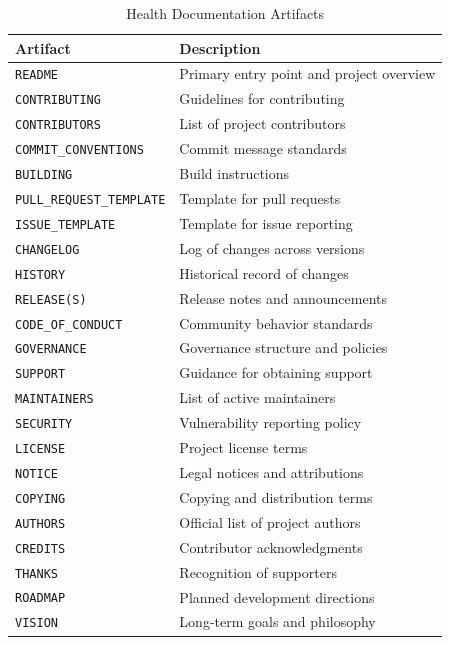 \documentclass[10pt,conference]{IEEEtran}
\begin{document}
\begin{table}[h]
\centering
\caption{Health Documentation Artifacts}
\label{tab:documentation_artifacts}
\renewcommand{\arraystretch}{1.3}
\begin{tabular}{p{3.5cm}p{4.5cm}}
\hline
\textbf{Artifact} & \textbf{Description} \\
\hline
\texttt{README} & Primary entry point and project overview \\
\texttt{CONTRIBUTING} & Guidelines for contributing \\
\texttt{CONTRIBUTORS} & List of project contributors \\
\texttt{COMMIT\_CONVENTIONS} & Commit message standards \\
\texttt{BUILDING} & Build instructions \\
\texttt{PULL\_REQUEST\_TEMPLATE} & Template for pull requests \\
\texttt{ISSUE\_TEMPLATE} & Template for issue reporting \\
\texttt{CHANGELOG} & Log of changes across versions \\
\texttt{HISTORY} & Historical record of changes \\
\texttt{RELEASE(S)} & Release notes and announcements \\
\texttt{CODE\_OF\_CONDUCT} & Community behavior standards \\
\texttt{GOVERNANCE} & Governance structure and policies \\
\texttt{SUPPORT} & Guidance for obtaining support \\
\texttt{MAINTAINERS} & List of active maintainers \\
\texttt{SECURITY} & Vulnerability reporting policy \\
\texttt{LICENSE} & Project license terms \\
\texttt{NOTICE} & Legal notices and attributions \\
\texttt{COPYING} & Copying and distribution terms \\
\texttt{AUTHORS} & Official list of project authors \\
\texttt{CREDITS} & Contributor acknowledgments \\
\texttt{THANKS} & Recognition of supporters \\
\texttt{ROADMAP} & Planned development directions \\
\texttt{VISION} & Long-term goals and philosophy \\
\hline
\end{tabular}
\end{table}
\end{document}
